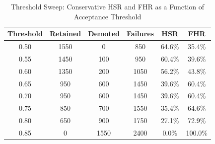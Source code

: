 \begin{table}[h]
\centering
\caption{Threshold Sweep: Conservative HSR and FHR as a Function of Acceptance Threshold}
\label{tab:threshold_sweep}
\begin{tabular}{cccccc}
\toprule
Threshold & Retained & Demoted & Failures & HSR & FHR \\
\midrule
0.50 & 1550 & 0 & 850 & 64.6\% & 35.4\% \\
0.55 & 1450 & 100 & 950 & 60.4\% & 39.6\% \\
0.60 & 1350 & 200 & 1050 & 56.2\% & 43.8\% \\
0.65 & 950 & 600 & 1450 & 39.6\% & 60.4\% \\
0.70 & 950 & 600 & 1450 & 39.6\% & 60.4\% \\
0.75 & 850 & 700 & 1550 & 35.4\% & 64.6\% \\
0.80 & 650 & 900 & 1750 & 27.1\% & 72.9\% \\
0.85 & 0 & 1550 & 2400 & 0.0\% & 100.0\% \\
\bottomrule
\end{tabular}
\end{table}